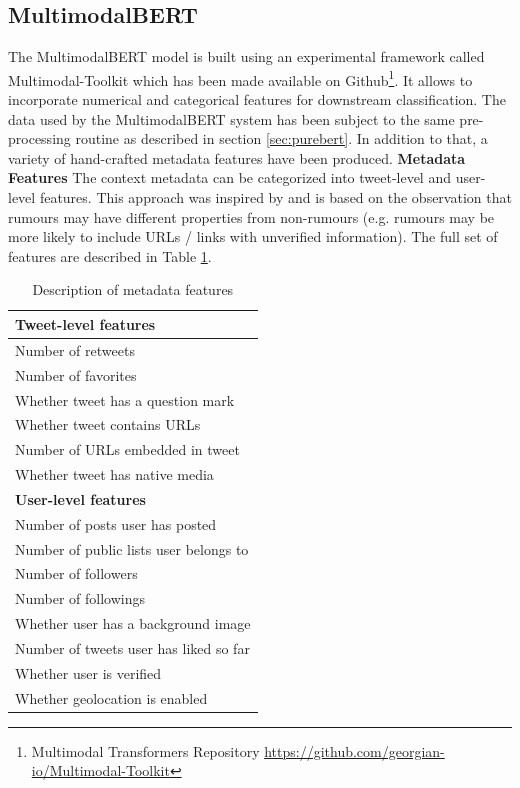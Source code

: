 \documentclass[11pt,a4paper]{article}
\begin{document}
\subsection{MultimodalBERT}
The MultimodalBERT model is built using an experimental framework called Multimodal-Toolkit which has been made available on Github\footnote{Multimodal Transformers Repository \url{https://github.com/georgian-io/Multimodal-Toolkit}}. It allows to incorporate numerical and categorical features for downstream classification. 
\newline
The data used by the MultimodalBERT system has been subject to the same pre-processing routine as described in section \ref{sec:purebert}. In addition to that, a variety of hand-crafted metadata features have been produced. 
\newline
\newline
\textbf{Metadata Features}
\newline
The context metadata can be categorized into tweet-level and user-level features. This approach was inspired by \cite{RN668} and is based on the observation that rumours may have different properties from non-rumours (e.g. rumours may be more likely to include URLs / links with unverified information). The full set of features are described in Table \ref{tbl:handcrafted_features}.
\begin{table}
\centering
\begin{tabular}{l}
\hline 
\textbf{Tweet-level features} \\ \hline
Number of retweets \\
Number of favorites \\
Whether tweet has a question mark \\
Whether tweet contains URLs \\
Number of URLs embedded in tweet \\
Whether tweet has native media \\
\hline
\textbf{User-level features} \\ \hline
Number of posts user has posted \\
Number of public lists user belongs to \\
Number of followers \\
Number of followings \\
Whether user has a background image \\
Number of tweets user has liked so far \\
Whether user is verified\\
Whether geolocation is enabled \\
\hline
\end{tabular}
\caption{Description of metadata features}
\label{tbl:handcrafted_features} 
\end{table}
\end{document}
